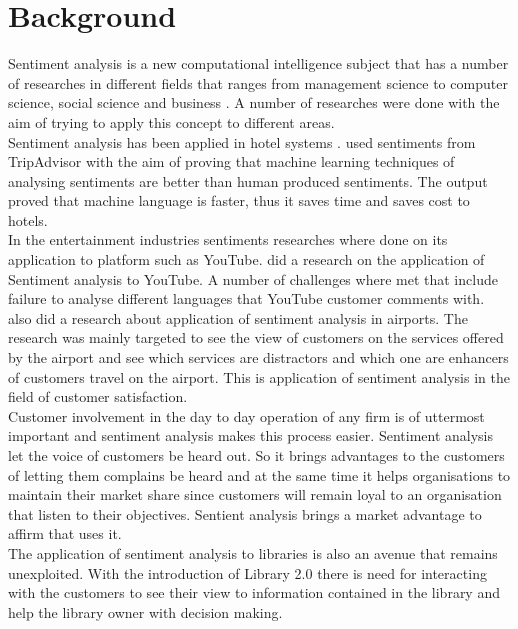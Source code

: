 \documentclass[12pt]{report}
\begin{document}
	\section{Background}
	Sentiment analysis is a new computational intelligence subject that has a number of researches in different fields that ranges from management science to computer science, social science and business \cite{alessia2015approaches}. A number of researches were done with the aim of trying to apply this concept to different areas.\\ 
	Sentiment analysis has been applied in hotel systems \citep{yang2016social}. \cite{yang2016social} used sentiments from TripAdvisor with the aim of proving that machine learning techniques of analysing sentiments are better than human produced sentiments. The output proved that machine language is faster, thus it saves time and saves cost to hotels.\\
	In the entertainment industries sentiments researches where done on its application to platform such as YouTube. \cite{asghar2015sentiment} did a research on the application of Sentiment analysis to YouTube. A number of challenges where met that include failure to analyse different languages that YouTube customer comments with.\\ 
	\cite{bogicevic2013airport} also did a research about application of sentiment analysis in airports. The research was mainly targeted to see the view of customers on the services offered by the airport and see which services are distractors and which one are enhancers of customers travel on the airport. This is application of sentiment analysis in the field of customer satisfaction.\\
	Customer involvement in the day to day operation of any firm is of uttermost important and sentiment analysis makes this process easier. Sentiment analysis let the voice of customers be heard out. So it brings advantages to the customers of letting them complains be heard and at the same time it helps organisations to maintain their market share since customers will remain loyal to an organisation that listen to their objectives. Sentient analysis brings a market advantage to affirm that uses it.\\
	The application of sentiment analysis to libraries is also an avenue that remains unexploited. With the introduction of Library 2.0 there is need for interacting with the customers to see their view to information contained in the library and help the library owner with decision making.\\
		
\end{document}
